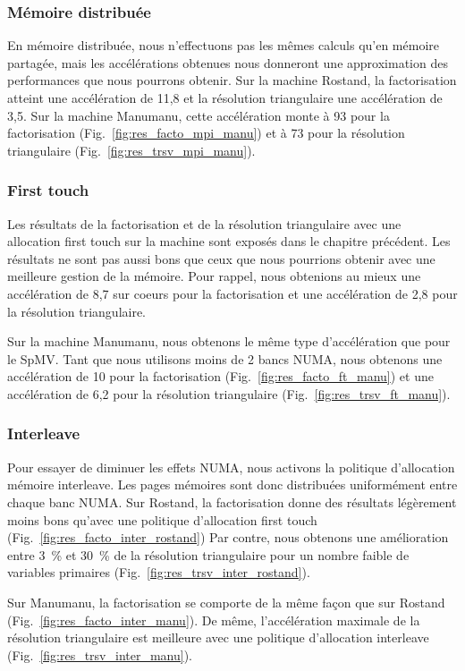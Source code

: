 \subsubsection{Mémoire distribuée}
En mémoire distribuée, nous n'effectuons pas les mêmes calculs qu'en mémoire partagée, mais les accélérations obtenues nous donneront une approximation des performances que nous pourrons obtenir.
%
Sur la machine Rostand, la factorisation atteint une accélération de 11,8 et la résolution triangulaire une accélération de 3,5.
%
Sur la machine Manumanu, cette accélération monte à 93 pour la factorisation (Fig.~\ref{fig:res_facto_mpi_manu}) et à 73 pour la résolution triangulaire (Fig.~\ref{fig:res_trsv_mpi_manu}).

\subsubsection{First touch}
Les résultats de la factorisation et de la résolution triangulaire avec une allocation first touch sur la machine  sont exposés dans le chapitre précédent.
%
Les résultats ne sont pas aussi bons que ceux que nous pourrions obtenir avec une meilleure gestion de la mémoire.
%
Pour rappel, nous obtenions au mieux une accélération de 8,7 sur coeurs pour la factorisation et une accélération de 2,8 pour la résolution triangulaire.

Sur la machine Manumanu, nous obtenons le même type d'accélération que pour le SpMV.
%
Tant que nous utilisons moins de 2 bancs NUMA, nous obtenons une accélération de 10 pour la factorisation (Fig.~\ref{fig:res_facto_ft_manu}) et une accélération de 6,2 pour la résolution triangulaire (Fig.~\ref{fig:res_trsv_ft_manu}).

\subsubsection{Interleave}
Pour essayer de diminuer les effets NUMA, nous activons la politique d'allocation mémoire interleave.
%
Les pages mémoires sont donc distribuées uniformément entre chaque banc NUMA.
%
Sur Rostand, la factorisation donne des résultats légèrement moins bons qu'avec une politique d'allocation first touch (Fig.~\ref{fig:res_facto_inter_rostand})
%
Par contre, nous obtenons une amélioration entre 3~\% et 30~\% de la résolution triangulaire pour un nombre faible de variables primaires (Fig.~\ref{fig:res_trsv_inter_rostand}).

Sur Manumanu, la factorisation se comporte de la même façon que sur Rostand (Fig.~\ref{fig:res_facto_inter_manu}).
%
De même, l'accélération maximale de la résolution triangulaire est meilleure avec une politique d'allocation interleave (Fig.~\ref{fig:res_trsv_inter_manu}).


